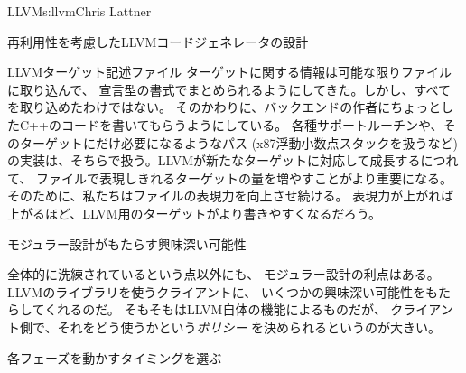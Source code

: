 \begin{aosachapter}{LLVM}{s:llvm}{Chris Lattner}
\begin{aosasect1}{再利用性を考慮したLLVMコードジェネレータの設計}
\begin{aosasect2}{LLVMターゲット記述ファイル}
ターゲットに関する情報は可能な限りファイルに取り込んで、
宣言型の書式でまとめられるようにしてきた。しかし、すべてを取り込めたわけではない。
そのかわりに、バックエンドの作者にちょっとしたC++のコードを書いてもらうようにしている。
各種サポートルーチンや、そのターゲットにだけ必要になるようなパス
(x87浮動小数点スタックを扱うなど)
の実装は、そちらで扱う。LLVMが新たなターゲットに対応して成長するにつれて、
ファイルで表現しきれるターゲットの量を増やすことがより重要になる。
そのために、私たちはファイルの表現力を向上させ続ける。
表現力が上がれば上がるほど、LLVM用のターゲットがより書きやすくなるだろう。

\end{aosasect2}

\end{aosasect1}

\begin{aosasect1}{モジュラー設計がもたらす興味深い可能性}

全体的に洗練されているという点以外にも、
モジュラー設計の利点はある。LLVMのライブラリを使うクライアントに、
いくつかの興味深い可能性をもたらしてくれるのだ。
そもそもはLLVM自体の機能によるものだが、
クライアント側で、それをどう使うかという\emph{ポリシー}
を決められるというのが大きい。

\begin{aosasect2}{各フェーズを動かすタイミングを選ぶ}


\end{aosasect2}
\end{aosasect1}
\end{aosachapter}
